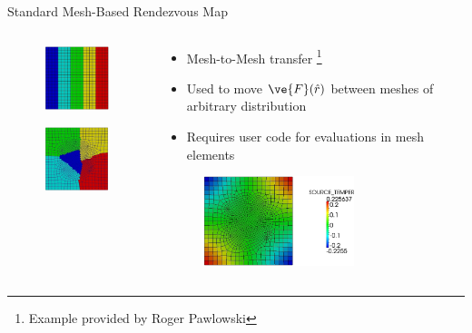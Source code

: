 \documentclass{beamer}
\begin{document}
\begin{frame}{Standard Mesh-Based Rendezvous Map}

  \begin{columns}
    
    \begin{column}{0.5\textwidth}
      \begin{figure}
      \centering
      \includegraphics[width=1.25in]{neutronics_parallel_decomp.png}
      \end{figure}

      \begin{figure}
      \centering
      \includegraphics[width=1.25in]{cfd_parallel_decomp.png}
      \end{figure}
    \end{column}

    \begin{column}{0.5\textwidth}
      \begin{itemize}
      \item Mesh-to-Mesh transfer \footnote{Example provided by Roger
        Pawlowski}
        \medskip
      \item Used to move $\ve{F}(\hat{r})$ between meshes of arbitrary
        distribution
        \medskip
      \item Requires user code for evaluations in mesh elements
      \end{itemize}

      \begin{figure}
      \centering
      \includegraphics[width=1.75in]{cfd_transferred_field.png}
      \end{figure}
    \end{column}

  \end{columns}

\end{frame}
\end{document}
